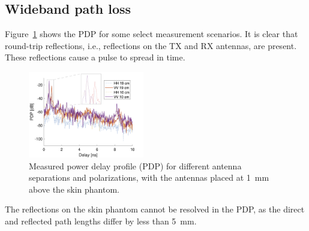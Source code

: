 \documentclass[preprint]{rsl}
\begin{document}
\subsection{Wideband path loss}

Figure~\ref{fig:PDP} shows the PDP for some select measurement scenarios. 
It is clear that round-trip reflections, i.e., reflections on the TX and RX antennas, are present.
These reflections cause a pulse to spread in time.
\begin{figure}[tb]
\begin{center}
	\includegraphics[width=0.45\textwidth]{figures/PDP}
\caption{Measured power delay profile (PDP) for different antenna separations and polarizations, with the antennas placed at 1~mm above the skin phantom.}
\label{fig:PDP}
\end{center}
\end{figure}
The reflections on the skin phantom cannot be resolved in the PDP, as the direct and reflected path lengths differ by less than 5~mm.
\end{document}

